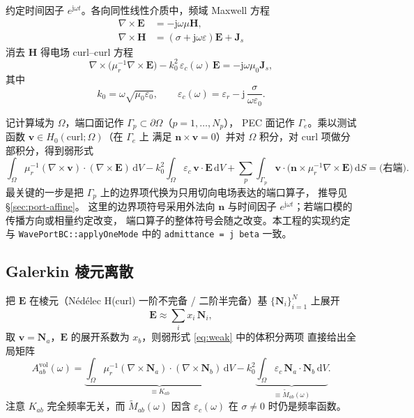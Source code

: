 \documentclass[UTF8,a4paper,11pt]{ctexart}
\newcommand{\dd}{\mathrm{d}}
\newcommand{\jj}{\mathrm{j}}
\newcommand{\Ne}{\bm{N}}
\newcommand{\code}[1]{\texttt{\small #1}}
\begin{document}
约定时间因子 $e^{\jj\omega t}$。各向同性线性介质中，频域 Maxwell 方程
\begin{align}
    \nabla\times\bm E&=-\jj\omega\mu\bm H,\\
    \nabla\times\bm H&=(\sigma+\jj\omega\varepsilon)\bm E+\bm J_s
\end{align}
消去 $\bm H$ 得电场 curl--curl 方程
\begin{equation}
    \nabla\times\bigl(\mu_r^{-1}\nabla\times\bm E\bigr)
    -k_0^{2}\,\varepsilon_c(\omega)\,\bm E
    =-\jj\omega\mu_0\bm J_s,
    \label{eq:curlcurl}
\end{equation}
其中
\begin{equation}
    k_0=\omega\sqrt{\mu_0\varepsilon_0},\qquad
    \varepsilon_c(\omega)=\varepsilon_r-\jj\,\frac{\sigma}{\omega\varepsilon_0}.
    \label{eq:eps_c}
\end{equation}

记计算域为 $\Omega$，端口面记作 $\Gamma_p\subset\partial\Omega$（$p=1,\dots,N_p$），
PEC 面记作 $\Gamma_e$。乘以测试函数 $\bm v\in H_0(\mathrm{curl};\Omega)$（在 $\Gamma_e$ 上
满足 $\bm n\times\bm v=0$）并对 $\Omega$ 积分，对 curl 项做分部积分，得到弱形式
\begin{equation}
    \int_\Omega\!\mu_r^{-1}(\nabla\times\bm v)\!\cdot\!(\nabla\times\bm E)\,\dd V
    -k_0^{2}\!\int_\Omega\!\varepsilon_c\,\bm v\!\cdot\!\bm E\,\dd V
    +\sum_{p}\!\int_{\Gamma_p}\!\bm v\!\cdot\!\bigl(\bm n\times\mu_r^{-1}\nabla\times\bm E\bigr)\,\dd S
    =\text{(右端)}.
    \label{eq:weak}
\end{equation}
最关键的一步是把 $\Gamma_p$ 上的边界项代换为只用切向电场表达的端口算子，
推导见 §\ref{sec:port-affine}。
这里的边界项符号采用外法向 $\bm n$ 与时间因子 $e^{\jj\omega t}$；若端口模的传播方向或相量约定改变，
端口算子的整体符号会随之改变。本工程的实现约定与 \code{WavePortBC::applyOneMode} 中的
\code{admittance = j beta} 一致。

\subsection{Galerkin 棱元离散}

把 $\bm E$ 在棱元（Nédélec H(curl) 一阶不完备 / 二阶半完备）基 $\{\Ne_i\}_{i=1}^{N}$
上展开
\begin{equation}
    \bm E\approx\sum_i x_i\,\Ne_i,
\end{equation}
取 $\bm v=\Ne_a$，$\bm E$ 的展开系数为 $x_b$，则弱形式 \eqref{eq:weak} 中的体积分两项
直接给出全局矩阵
\begin{equation}
    A_{ab}^{\text{vol}}(\omega)
    =\underbrace{\int_\Omega\!\mu_r^{-1}(\nabla\!\times\!\Ne_a)\!\cdot\!(\nabla\!\times\!\Ne_b)\,\dd V}_{\equiv K_{ab}}
    -k_0^2\underbrace{\int_\Omega\!\varepsilon_c\,\Ne_a\!\cdot\!\Ne_b\,\dd V}_{\equiv \tilde M_{ab}(\omega)}.
    \label{eq:Avol}
\end{equation}
注意 $K_{ab}$ 完全频率无关，而 $\tilde M_{ab}(\omega)$ 因含 $\varepsilon_c(\omega)$ 在
$\sigma\neq0$ 时仍是频率函数。
\end{document}
